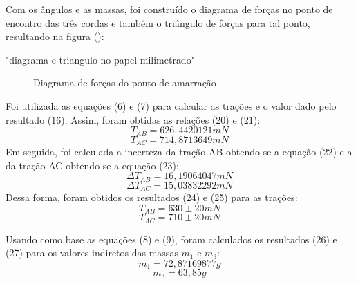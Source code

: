 \documentclass[12pt, letterpaper]{article}
\begin{document}
    Com os ângulos e as massas, foi construído o diagrama de forças no ponto de encontro das três cordas e também o triângulo de forças para tal ponto, resultando na figura ():

    "diagrama e triangulo no papel milimetrado"
    \begin{figure}[!h]
        \centering
        \caption{Diagrama de forças do ponto de amarração}
        \label{fig:diagrama_forcas}
    \end{figure}

    Foi utilizada as equações (6) e (7) para calcular as trações e o valor dado pelo resultado (16). Assim, foram obtidas as relações (20) e (21):
    \begin{equation}
        T_{AB} = 626,4420121 mN
    \end{equation}
    \begin{equation}
        T_{AC} = 714,8713649 mN
    \end{equation}
    Em seguida, foi calculada a incerteza da tração AB obtendo-se a equação (22) e a da tração AC obtendo-se a equação (23):
    \begin{equation}
        \Delta T_{AB} = 16,19064047 mN
    \end{equation}
    \begin{equation}
        \Delta T_{AC} = 15,03832292 mN
    \end{equation}
    Dessa forma, foram obtidos os resultados (24) e (25) para as trações:
    \begin{equation}
        T_{AB} = 630 \pm 20 mN 
    \end{equation}
    \begin{equation}
        T_{AC} = 710 \pm 20 mN
    \end{equation}

    Usando como base as equações (8) e (9), foram calculados os resultados (26) e (27) para os valores indiretos das massas $m_{1}$ e $m_{3}$:
    \begin{equation}
        m_{1} = 72,87169877 g
    \end{equation}
    \begin{equation}
        m_{3} = 63,85 g
    \end{equation}
\end{document}
